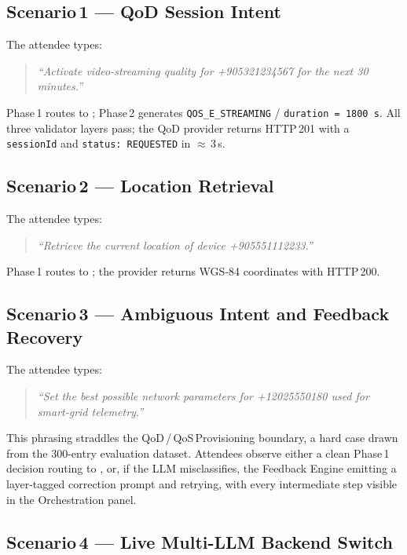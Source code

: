 \documentclass[conference]{IEEEtran}
\begin{document}
\subsection[Scenario 1 --- English QoD Intent]{Scenario\,1 --- QoD Session Intent}

The attendee types:
\begin{quote}\small
\textit{``Activate video-streaming quality for +905321234567
for the next 30\,minutes.''}
\end{quote}
Phase\,1 routes to ;
Phase\,2 generates \texttt{QOS\_E\_STREAMING} /
\texttt{duration\,=\,1800\,s}.
All three validator layers pass; the QoD provider returns HTTP\,201
with a \texttt{sessionId} and \texttt{status:\,REQUESTED} in
$\approx$\,3\,s.

\subsection[Scenario 2 --- Location Retrieval]{Scenario\,2 --- Location Retrieval}

The attendee types:
\begin{quote}\small
\textit{``Retrieve the current location of device +905551112233.''}
\end{quote}
Phase\,1 routes to ;
the provider returns WGS-84 coordinates with HTTP\,200.

\subsection[Scenario 3 --- Ambiguous Intent and Feedback Recovery]{Scenario\,3 --- Ambiguous Intent and Feedback Recovery}

The attendee types:
\begin{quote}\small
\textit{``Set the best possible network parameters for +12025550180
used for smart-grid telemetry.''}
\end{quote}
This phrasing straddles the QoD\,/\,QoS\,Provisioning boundary, a
hard case drawn from the 300-entry evaluation dataset.
Attendees observe either a clean Phase\,1 decision routing to
, or, if the LLM
misclassifies, the Feedback Engine emitting a layer-tagged
correction prompt and retrying, with every intermediate step visible
in the Orchestration panel.

\subsection[Scenario 4 --- Live Multi-LLM Backend Switch]{Scenario\,4 --- Live Multi-LLM Backend Switch}
\end{document}
